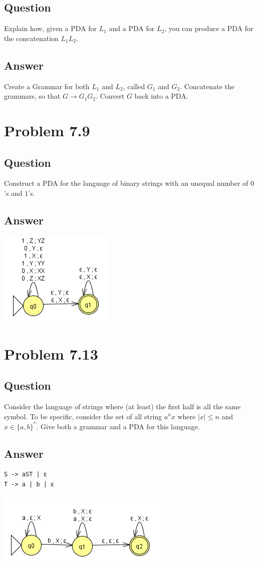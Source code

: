 \documentclass[12pt, a4paper]{article}
\begin{document}
\subsection{Question}
Explain how, given a PDA for $L_{1}$ and a PDA for $L_{2}$, you can produce a PDA for the concatenation $L_{1}L_{2}$.
\subsection{Answer}
Create a Grammar for both $L_{1}$ and $L_{2}$, called $G_{1}$ and $G_{2}$. Concatenate the grammars, so that $G \to G_{1}G_{2}$. Convert $G$ back into a PDA.

\section{Problem 7.9}
\subsection{Question}
Construct a PDA for the language of binary strings with an unequal number of $0$'s and $1$'s.
\subsection{Answer}
\begin{center}
\includegraphics[scale=1]{7.9}
\end{center}

\section{Problem 7.13}
\subsection{Question}
Consider the language of strings where (at least) the first half is all the same symbol. To be specific, consider the set of all string $a^{n}x$ where $|x| \leq n$ and $x \in \{a,b\}^{*}$. Give both a grammar and a PDA for this language.
\subsection{Answer}
\begin{lstlisting}
S -> aST | ε
T -> a | b | ε
\end{lstlisting}
\begin{center}
\includegraphics[scale=1]{7.13}
\end{center}
\end{document}
